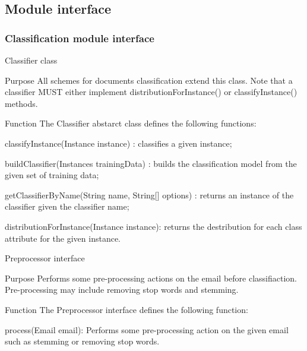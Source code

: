 \documentclass[12pt]{article}
\newenvironment{my_itemize}
{\begin{itemize}
  \setlength{\itemsep}{0cm}
  \setlength{\parskip}{0cm}}
{\end{itemize}}
\newenvironment{my_desc}
{\begin{description}
  \setlength{\itemsep}{0cm}
  \setlength{\parskip}{0cm}}
{\end{description}}
\begin{document}
\subsection{Module interface}
\subsubsection{Classification module interface}
\begin{my_itemize}
  \item Classifier class
  \begin{my_desc}
   \item[Purpose] All schemes for documents classification extend this class. Note that a classifier MUST either implement distributionForInstance() or classifyInstance() methods.
   \item[Function] The Classifier abstarct class defines the following functions:
	\begin{my_itemize}
		\item classifyInstance(Instance instance) : classifies a given instance;
		\item buildClassifier(Instances trainingData) : builds the classification model from the given set of training data;
		\item getClassifierByName(String name, String[] options) : returns an instance of the classifier given the classifier name;
		\item distributionForInstance(Instance instance): returns the destribution for each class attribute for the given instance.
	\end{my_itemize}
  \end{my_desc}

  \item Preprocessor interface
  \begin{my_desc}
   \item[Purpose] Performs some pre-processing actions on the email before classifiaction. Pre-processing may include removing stop words and stemming. 
   \item[Function] The Preprocessor interface defines the following function:
	\begin{my_itemize}
	\item process(Email email): Performs some pre-processing action on the given email such as stemming or removing stop words.
	\end{my_itemize}
  \end{my_desc}


\end{my_itemize}
\end{document}
